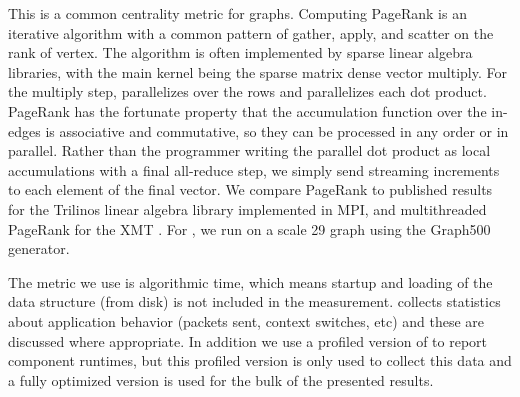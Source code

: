 \vspace{0.5ex}
 This is a common centrality metric for
graphs. Computing PageRank is an iterative algorithm with a common
pattern of gather, apply, and scatter on the rank of vertex. The algorithm
is often implemented by sparse linear algebra libraries, with the main
kernel being the sparse matrix dense vector multiply. For the multiply
step, \Grappa parallelizes over the rows and parallelizes each dot
product. PageRank has the fortunate property that the accumulation
function over the in-edges is associative and commutative, so they can
be processed in any order or in parallel. Rather than the programmer writing the
parallel dot product as local accumulations with a final all-reduce
step, we simply send streaming increments to each element of the final
vector. We compare PageRank to published results for the Trilinos linear algebra library implemented in MPI, and multithreaded PageRank for the XMT \cite{MTGL:pagerank}.
For \Grappa, we run on a scale 29 graph using the Graph500 generator.

The metric we use is algorithmic time, which means startup and loading of the
data structure (from disk) is not included in the measurement. \Grappa
collects statistics about application behavior (packets sent, context
switches, etc) and these are discussed where appropriate. In addition we use a
profiled version of \Grappa to report component runtimes, but this profiled
version is only used to collect this data and a fully optimized version is
used for the bulk of the presented results.

